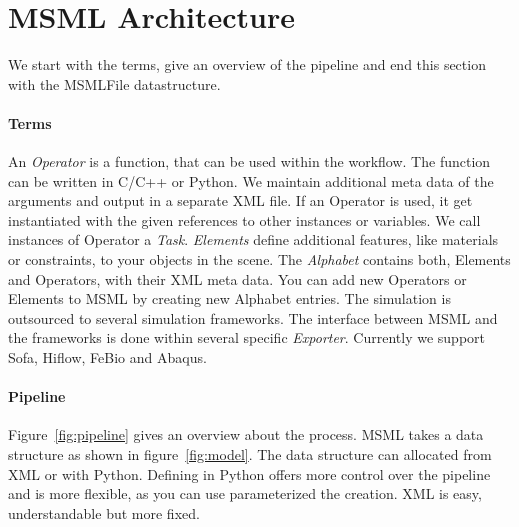 \section{MSML Architecture}
\label{sec:msml-architecture}

We start with the terms, give an overview of the pipeline and end this
section with the MSMLFile datastructure.

\paragraph{Terms}

An \emph{Operator} is a function, that can be used within the
workflow. The function can be written in C/C++ or Python. We maintain additional
meta data of the arguments and output in a separate XML
file. If an Operator is used, it get instantiated with the given
references to other instances or variables. We call instances of
Operator a \emph{Task}. \emph{Elements} define additional features,
like materials or constraints, to your objects in the scene.
The \emph{Alphabet} contains both, Elements and Operators, with their
XML meta data. You can add new Operators or Elements to MSML by
creating new Alphabet entries. The simulation is outsourced to several
simulation frameworks. The interface between MSML and the frameworks
is done within several specific \emph{Exporter}. Currently we support
Sofa, Hiflow, FeBio and Abaqus.

\paragraph{Pipeline}
\label{sec:pipeline}

Figure~\ref{fig:pipeline} gives an overview about the process.
MSML takes a data structure as shown in figure~\ref{fig:model}.
The data structure can allocated from XML or with Python.
Defining in Python offers more control over the pipeline and is more
flexible, as you can use parameterized the creation.
XML is easy, understandable but more fixed.

